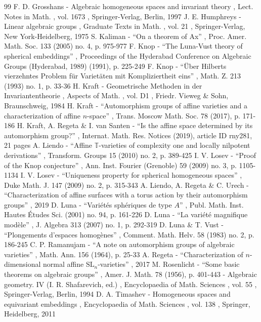\documentclass[11pt]{article}
\numberwithin{equation}{section}
\theoremstyle{plain}
\theoremstyle{definition}
\begin{document}
\begin{thebibliography}{99}
 F. D. Grosshans - Algebraic homogeneous spaces and invariant theory , Lect. Notes in Math. , vol. 1673 , Springer-Verlag, Berlin, 1997
 J. E. Humphreys - Linear algebraic groups , Graduate Texts in Math. , vol. 21 , Springer-Verlag, New York-Heidelberg, 1975
 S. Kaliman - “On a theorem of Ax” , Proc. Amer. Math. Soc. 133 (2005) no. 4, p. 975-977
 F. Knop - “The Luna-Vust theory of spherical embeddings” , Proceedings of the Hyderabad Conference on Algebraic Groups (Hyderabad, 1989) (1991), p. 225-249
 F. Knop - “Über Hilberts vierzehntes Problem für Varietäten mit Kompliziertheit eins” , Math. Z. 213 (1993) no. 1, p. 33-36
 H. Kraft - Geometrische Methoden in der Invariantentheorie , Aspects of Math. , vol. D1 , Friedr. Vieweg \& Sohn, Braunschweig, 1984
 H. Kraft - “Automorphism groups of affine varieties and a characterization of affine $n$-space” , Trans. Moscow Math. Soc. 78 (2017), p. 171-186
 H. Kraft, A. Regeta \& I. van Santen - “Is the affine space determined by its automorphism group?” , Internat. Math. Res. Notices (2019), article ID rny281, 21 pages
 A. Liendo - “Affine $\mathbb{T}$-varieties of complexity one and locally nilpotent derivations” , Transform. Groups 15 (2010) no. 2, p. 389-425
 I. V. Losev - “Proof of the Knop conjecture” , Ann. Inst. Fourier (Grenoble) 59 (2009) no. 3, p. 1105-1134
 I. V. Losev - “Uniqueness property for spherical homogeneous spaces” , Duke Math. J. 147 (2009) no. 2, p. 315-343
 A. Liendo, A. Regeta \& C. Urech - “Characterization of affine surfaces with a torus action by their automorphism groups” , 2019
 D. Luna - “Variétés sphériques de type $A$” , Publ. Math. Inst. Hautes Études Sci. (2001) no. 94, p. 161-226
 D. Luna - “La variété magnifique modèle” , J. Algebra 313 (2007) no. 1, p. 292-319
 D. Luna \& T. Vust - “Plongements d’espaces homogènes” , Comment. Math. Helv. 58 (1983) no. 2, p. 186-245
 C. P. Ramanujam - “A note on automorphism groups of algebraic varieties” , Math. Ann. 156 (1964), p. 25-33
 A. Regeta - “Characterization of $n$-dimensional normal affine $\mathrm{SL}_n$-varieties” , 2017
 M. Rosenlicht - “Some basic theorems on algebraic groups” , Amer. J. Math. 78 (1956), p. 401-443
 - Algebraic geometry. IV (I. R. Shafarevich, ed.) , Encyclopaedia of Math. Sciences , vol. 55 , Springer-Verlag, Berlin, 1994
 D. A. Timashev - Homogeneous spaces and equivariant embeddings , Encyclopaedia of Math. Sciences , vol. 138 , Springer, Heidelberg, 2011
\end{thebibliography}
\end{document}
